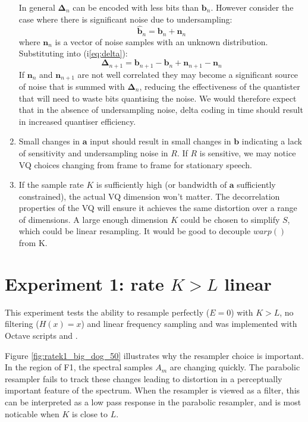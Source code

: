 \documentclass{article}
\begin{document}
\begin{enumerate}
In general $\mathbf{\Delta}_n$ can be encoded with less bits than $\mathbf{b}_n$.  However consider the case where there is significant noise due to undersampling:
\begin{equation}
\mathbf{\hat{b}}_n = \mathbf{b}_{n} + \mathbf{n}_{n}
\end{equation}
where $\mathbf{n}_{n}$ is a vector of noise samples with an unknown distribution. Substituting into (i\ref{eq:delta}):
\begin{equation}
\mathbf{\Delta}_{n+1} = \mathbf{b}_{n+1} - \mathbf{b}_{n} + \mathbf{n}_{n+1} - \mathbf{n}_{n}
\end{equation}
If $\mathbf{n}_{n}$ and $\mathbf{n}_{n+1}$ are not well correlated they may become a significant source of noise that is summed with $\mathbf{\Delta}_{n}$, reducing the effectiveness of the quantister that will need to waste bits quantising the noise. We would therefore expect that in the absence of undersampling noise, delta coding in time should result in increased quantiser efficiency.

\item Small changes in $\mathbf{a}$ input should result in small changes in $\mathbf{b}$ indicating a lack of sensitivity and undersampling noise in $R$.  If $R$ is sensitive, we may notice VQ choices changing from frame to frame for stationary speech.

\item If the sample rate $K$ is sufficiently high (or bandwidth of $\mathbf{a}$ sufficiently constrained), the actual VQ dimension won't matter.  The decorrelation properties of the VQ will ensure it achieves the same distortion over a range of dimensions.  A large enough dimension $K$ could be chosen to simplify $S$, which could be linear resampling. It would be good to decouple $warp()$ from K.
\end{enumerate}

\section{Experiment 1: rate $K>L$ linear}

This experiment tests the ability to resample perfectly ($E=0$) with $K>L$, no filtering ($H(x)=x$) and linear frequency sampling and was implemented with Octave scripts  and .

Figure \ref{fig:ratek1_big_dog_50} illustrates why the resampler choice is important.  In the region of F1, the spectral samples $A_{m}$ are changing quickly.  The parabolic resampler fails to track these changes leading to distortion in a perceptually important feature of the spectrum.  When the resampler is viewed as a filter, this can be interpreted as a low pass response in the parabolic resampler, and is most noticable when $K$ is close to $L$.
\end{document}
